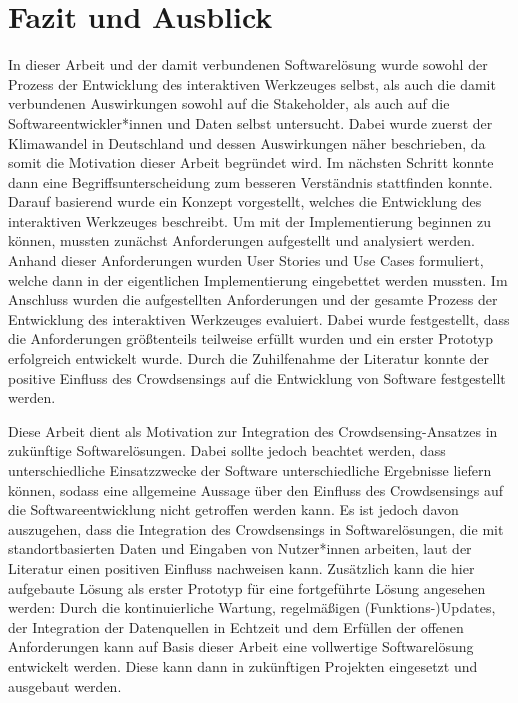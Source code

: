 \chapter{Fazit und Ausblick}

In dieser Arbeit und der damit verbundenen Softwarelösung wurde sowohl der Prozess der Entwicklung des interaktiven Werkzeuges selbst, als auch die damit verbundenen Auswirkungen sowohl auf die Stakeholder, als auch auf die Softwareentwickler*innen und Daten selbst untersucht. Dabei wurde zuerst der Klimawandel in Deutschland und dessen Auswirkungen näher beschrieben, da somit die Motivation dieser Arbeit begründet wird. Im nächsten Schritt konnte dann eine Begriffsunterscheidung zum besseren Verständnis stattfinden konnte. Darauf basierend wurde ein Konzept vorgestellt, welches die Entwicklung des interaktiven Werkzeuges beschreibt. Um mit der Implementierung beginnen zu können, mussten zunächst Anforderungen aufgestellt und analysiert werden. Anhand dieser Anforderungen wurden User Stories und Use Cases formuliert, welche dann in der eigentlichen Implementierung eingebettet werden mussten. Im Anschluss wurden die aufgestellten Anforderungen und der gesamte Prozess der Entwicklung des interaktiven Werkzeuges evaluiert. Dabei wurde festgestellt, dass die Anforderungen größtenteils teilweise erfüllt wurden und ein erster Prototyp erfolgreich entwickelt wurde. Durch die Zuhilfenahme der Literatur konnte der positive Einfluss des Crowdsensings auf die Entwicklung von Software festgestellt werden.

Diese Arbeit dient als Motivation zur Integration des Crowdsensing-Ansatzes in zukünftige Softwarelösungen. Dabei sollte jedoch beachtet werden, dass unterschiedliche Einsatzzwecke der Software unterschiedliche Ergebnisse liefern können, sodass eine allgemeine Aussage über den Einfluss des Crowdsensings auf die Softwareentwicklung nicht getroffen werden kann. Es ist jedoch davon auszugehen, dass die Integration des Crowdsensings in Softwarelösungen, die mit standortbasierten Daten und Eingaben von Nutzer*innen arbeiten, laut der Literatur einen positiven Einfluss nachweisen kann. Zusätzlich kann die hier aufgebaute Lösung als erster Prototyp für eine fortgeführte Lösung angesehen werden: Durch die kontinuierliche Wartung, regelmäßigen (Funktions-)Updates, der Integration der Datenquellen in Echtzeit und dem Erfüllen der offenen Anforderungen kann auf Basis dieser Arbeit eine vollwertige Softwarelösung entwickelt werden. Diese kann dann in zukünftigen Projekten eingesetzt und ausgebaut werden.

